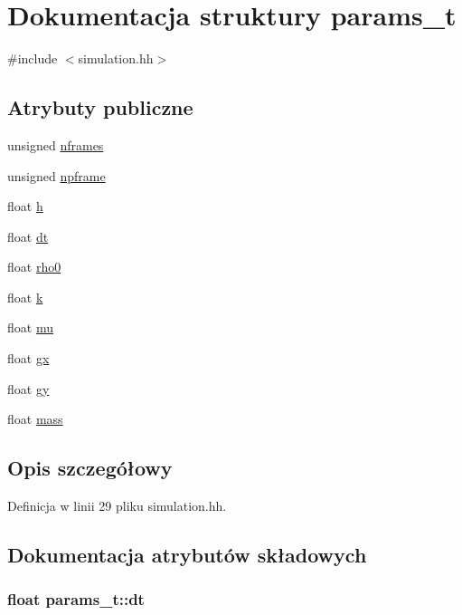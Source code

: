 \hypertarget{structparams__t}{\section{Dokumentacja struktury params\-\_\-t}
\label{structparams__t}
}


{\ttfamily \#include $<$simulation.\-hh$>$}

\subsection*{Atrybuty publiczne}
\begin{DoxyCompactItemize}
\item 
unsigned \hyperlink{structparams__t_a2cecc28f4ca024657cf567047e2aba59}{nframes}
\item 
unsigned \hyperlink{structparams__t_a06a1a567fd5ba13905514227e2bb710a}{npframe}
\item 
float \hyperlink{structparams__t_a27d76064f2ae0cb93a0956027cfcc19b}{h}
\item 
float \hyperlink{structparams__t_a81fc6596e9b1446442ebf3eef2c3fb01}{dt}
\item 
float \hyperlink{structparams__t_a2eb309edb681d0a998f23fc692a73781}{rho0}
\item 
float \hyperlink{structparams__t_a97ee2783cf89cee1151be3250e9054b3}{k}
\item 
float \hyperlink{structparams__t_a971359c29b2f946b477e4a1b3605fa3f}{mu}
\item 
float \hyperlink{structparams__t_a9f3f70c0cdedcb053c9d45c2e41e67b6}{gx}
\item 
float \hyperlink{structparams__t_a0da484b4cc6a542875aa7b92e200f507}{gy}
\item 
float \hyperlink{structparams__t_afe4a59fe43565a71a0a7a155714e2af1}{mass}
\end{DoxyCompactItemize}


\subsection{Opis szczegółowy}


Definicja w linii 29 pliku simulation.\-hh.



\subsection{Dokumentacja atrybutów składowych}
\hypertarget{structparams__t_a81fc6596e9b1446442ebf3eef2c3fb01}{
\subsubsection[{dt}]{\setlength{\rightskip}{0pt plus 5cm}float params\-\_\-t\-::dt}}\label{structparams__t_a81fc6596e9b1446442ebf3eef2c3fb01}


